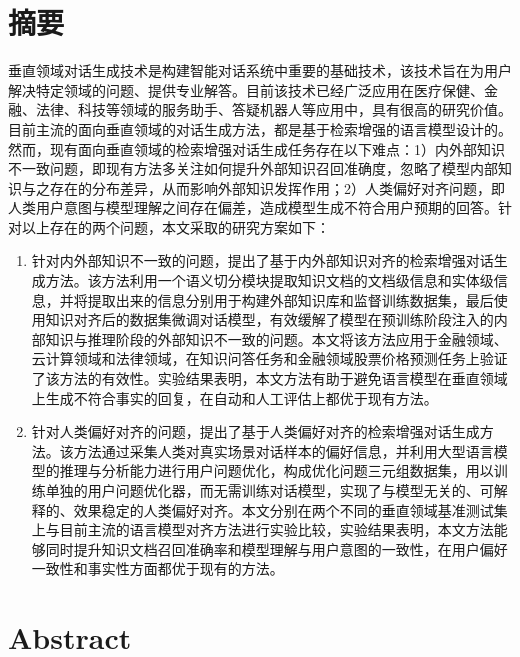 \chapter{摘\texorpdfstring{\quad}{}要}

垂直领域对话生成技术是构建智能对话系统中重要的基础技术，该技术旨在为用户解决特定领域的问题、提供专业解答。目前该技术已经广泛应用在医疗保健、金融、法律、科技等领域的服务助手、答疑机器人等应用中，具有很高的研究价值。目前主流的面向垂直领域的对话生成方法，都是基于检索增强的语言模型设计的。然而，现有面向垂直领域的检索增强对话生成任务存在以下难点：1）内外部知识不一致问题，即现有方法多关注如何提升外部知识召回准确度，忽略了模型内部知识与之存在的分布差异，从而影响外部知识发挥作用；2）人类偏好对齐问题，即人类用户意图与模型理解之间存在偏差，造成模型生成不符合用户预期的回答。针对以上存在的两个问题，本文采取的研究方案如下：

\begin{enumerate}[topsep = 0 pt, itemsep= 0 pt, parsep=0pt, partopsep=0pt, leftmargin=0pt, itemindent=44pt, labelsep=6pt, listparindent=24pt, label=\arabic*)]
	\item 针对内外部知识不一致的问题，提出了基于内外部知识对齐的检索增强对话生成方法。该方法利用一个语义切分模块提取知识文档的文档级信息和实体级信息，并将提取出来的信息分别用于构建外部知识库和监督训练数据集，最后使用知识对齐后的数据集微调对话模型，有效缓解了模型在预训练阶段注入的内部知识与推理阶段的外部知识不一致的问题。本文将该方法应用于金融领域、云计算领域和法律领域，在知识问答任务和金融领域股票价格预测任务上验证了该方法的有效性。实验结果表明，本文方法有助于避免语言模型在垂直领域上生成不符合事实的回复，在自动和人工评估上都优于现有方法。

	\item 针对人类偏好对齐的问题，提出了基于人类偏好对齐的检索增强对话生成方法。该方法通过采集人类对真实场景对话样本的偏好信息，并利用大型语言模型的推理与分析能力进行用户问题优化，构成优化问题三元组数据集，用以训练单独的用户问题优化器，而无需训练对话模型，实现了与模型无关的、可解释的、效果稳定的人类偏好对齐。本文分别在两个不同的垂直领域基准测试集上与目前主流的语言模型对齐方法进行实验比较，实验结果表明，本文方法能够同时提升知识文档召回准确率和模型理解与用户意图的一致性，在用户偏好一致性和事实性方面都优于现有的方法。
\end{enumerate}


\chapter{Abstract}

